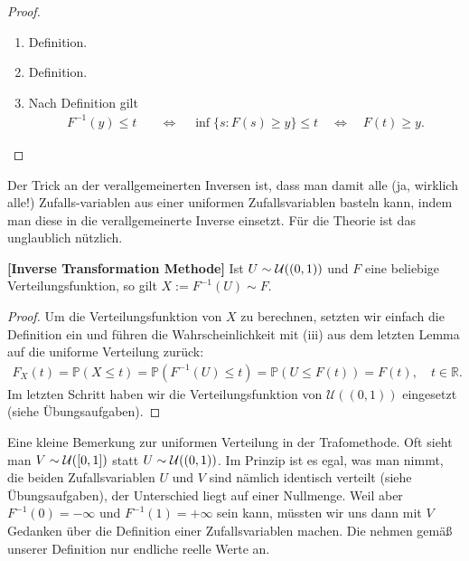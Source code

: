 \begin{proof}\abs 
	\begin{enumerate}[label=(\roman*)]
		\item Definition. 
		\item Definition.
		\item Nach Definition gilt 
			\begin{align*}
			 	F^{-1}(y) \leq t \quad &\Leftrightarrow\quad \inf \{ s \colon F(s) \geq y \} \leq t \quad \Leftrightarrow\quad F(t) \geq y.
			\end{align*}	
	\end{enumerate}
\end{proof}
Der Trick an der verallgemeinerten Inversen ist, dass man damit alle (ja, wirklich alle!) Zufalls-variablen aus einer uniformen Zufallsvariablen basteln kann, indem man diese in die verallgemeinerte Inverse einsetzt. F\"ur die Theorie ist das unglaublich n\"utzlich.
\begin{satz}\label{NurU}
 \textbf{[Inverse Transformation Methode]}
	Ist $U \sim \mathcal{U}((0,1))$ und $F$ eine beliebige Verteilungsfunktion, so gilt $X := F^{-1}(U)\sim F$.
\end{satz}

\begin{proof}
	Um die Verteilungsfunktion von $X$ zu berechnen, setzten wir einfach die Definition ein und f\"uhren die Wahrscheinlichkeit mit (iii) aus dem letzten Lemma auf die uniforme Verteilung zur\"uck:
\begin{align*}
	F_X(t) = \mathbb{P}(X \leq t) = \mathbb{P}(F^{-1}(U) \leq t) = \mathbb{P}(U \leq F(t)) = F(t),\quad t\in\mathbb{R}.
\end{align*}
Im letzten Schritt haben wir die Verteilungsfunktion von $\mathcal U((0,1))$ eingesetzt (siehe \"Ubungsaufgaben).
\end{proof}
Eine kleine Bemerkung zur uniformen Verteilung in der Trafomethode. Oft sieht man $V \sim \mathcal{U}([0,1])$ statt $U \sim \mathcal{U}((0,1))$. Im Prinzip ist es egal, was man nimmt, die beiden Zufallsvariablen $U$ und $V$ sind n\"amlich identisch verteilt (siehe \"Ubungsaufgaben), der Unterschied liegt auf einer Nullmenge. Weil aber $F^{-1}(0)=-\infty$ und $F^{-1}(1)=+\infty$ sein kann, m\"ussten wir uns dann mit $V$ Gedanken \"uber die Definition einer Zufallsvariablen machen. Die nehmen gem\"a\ss{} unserer Definition nur endliche reelle Werte an. \smallskip

